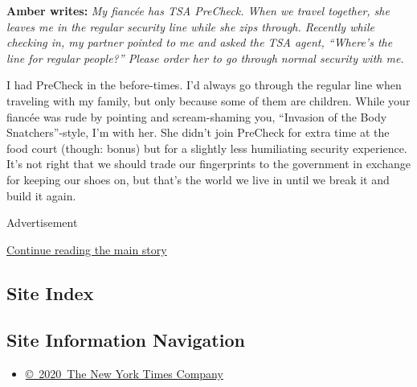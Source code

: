 \textbf{Amber writes:} \emph{My fiancée has TSA PreCheck. When we travel
together, she leaves me in the regular security line while she zips
through. Recently while checking in, my partner pointed to me and asked
the TSA agent, ``Where's the line for regular people?'' Please order her
to go through normal security with me.}

I had PreCheck in the before-times. I'd always go through the regular
line when traveling with my family, but only because some of them are
children. While your fiancée was rude by pointing and scream-shaming
you, ``Invasion of the Body Snatchers''-style, I'm with her. She didn't
join PreCheck for extra time at the food court (though: bonus) but for a
slightly less humiliating security experience. It's not right that we
should trade our fingerprints to the government in exchange for keeping
our shoes on, but that's the world we live in until we break it and
build it again.

Advertisement

\protect\hyperlink{after-bottom}{Continue reading the main story}

\hypertarget{site-index}{%
\subsection{Site Index}\label{site-index}}

\hypertarget{site-information-navigation}{%
\subsection{Site Information
Navigation}\label{site-information-navigation}}

\begin{itemize}
\tightlist
\item
  \href{https://help.nytimes3xbfgragh.onion/hc/en-us/articles/115014792127-Copyright-notice}{©~2020~The
  New York Times Company}
\end{itemize}

